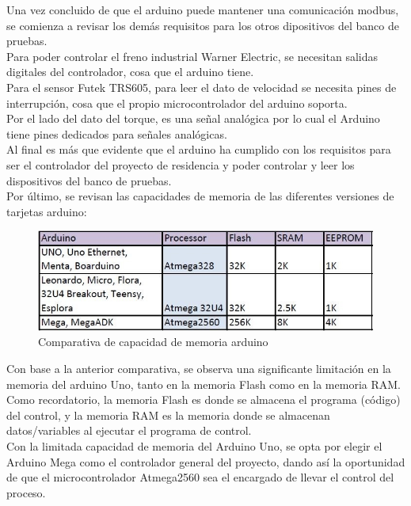 \documentclass[12pt,titlepage]{article}
\begin{document}
Una vez concluido de que el arduino puede mantener una comunicación modbus, se comienza a revisar los demás requisitos para los otros dipositivos del banco de pruebas. \\

Para poder controlar el freno industrial Warner Electric, se necesitan salidas digitales del controlador, cosa que el arduino tiene. \\

Para el sensor Futek TRS605, para leer el dato de velocidad se necesita pines de interrupción, cosa que el propio microcontrolador del arduino soporta. \\

Por el lado del dato del torque, es una señal analógica por lo cual el Arduino tiene pines dedicados para señales analógicas. \\

Al final es más que evidente que el arduino ha cumplido con los requisitos para ser el controlador del proyecto de residencia y poder controlar y leer los dispositivos del banco de pruebas. \\ 


\newpage
Por último, se revisan las capacidades de memoria de las diferentes versiones de tarjetas arduino: 

 \begin{figure}[htbp]
\hspace*{2.1cm} 
\includegraphics[scale=0.89]{memoria_arduino}
\caption{Comparativa de capacidad de memoria arduino}
\end{figure}

Con base a la anterior comparativa, se observa una significante limitación en la memoria del arduino Uno, tanto en la memoria Flash como en la memoria RAM. \\

Como recordatorio, la memoria Flash es donde se almacena el programa (código) del control, y la memoria RAM es la memoria donde se almacenan datos/variables al ejecutar el programa de control. \\ 

Con la limitada capacidad de memoria del Arduino Uno, se opta por elegir el Arduino Mega como el controlador general del proyecto, dando así la oportunidad de que el microcontrolador Atmega2560 sea el encargado de llevar el control del proceso.\\ 
\end{document}
